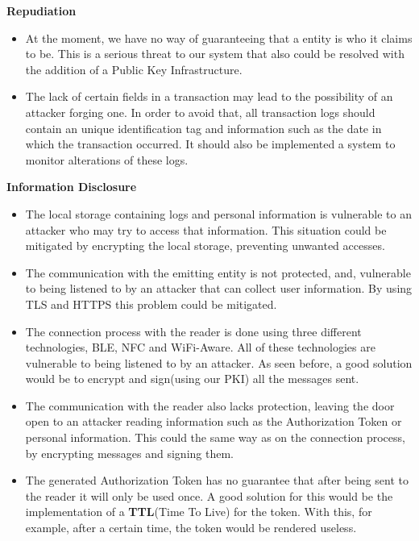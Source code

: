 \textbf{Repudiation}
\begin{itemize}
    \item At the moment, we have no way of guaranteeing that a entity is who it claims to be. This is a serious threat to our system that also could be resolved with the addition of a Public Key Infrastructure.\cite{pki}
    \item The lack of certain fields in a transaction may lead to the possibility of an attacker forging one. In order to avoid that, all transaction logs should contain an unique identification tag and information such as the date in which the transaction occurred. It should also be implemented a system to monitor alterations of these logs.
\end{itemize}

\textbf{Information Disclosure}
\begin{itemize}
    \item The local storage containing logs and personal information is vulnerable to an attacker who may try to access that information. This situation could be mitigated by encrypting the local storage, preventing unwanted accesses.
    \item The communication with the emitting entity is not protected, and, vulnerable to being listened to by an attacker that can collect user information. By using TLS\cite{tls} and HTTPS this problem could be mitigated.
    \item The connection process with the reader is done using three different technologies, BLE, NFC and WiFi-Aware. All of these technologies are vulnerable to being listened to by an attacker. As seen before, a good solution would be to encrypt and sign(using our PKI) all the messages sent.
    \item The communication with the reader also lacks protection, leaving the door open to an attacker reading information such as the Authorization Token or personal information. This could the same way as on the connection process, by encrypting messages and signing them. 
    \item The generated Authorization Token has no guarantee that after being sent to the reader it will only be used once. A good solution for this would be the implementation of a \textbf{TTL}(Time To Live) for the token. With this, for example, after a certain time, the token would be rendered useless.
\end{itemize}

